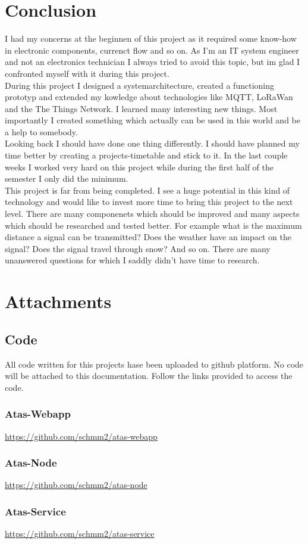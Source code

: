 \documentclass[a4paper,11pt, oneside]{report}
\theoremstyle{definition}
\begin{document}
\chapter{Conclusion}
I had my concerns at the beginnen of this project as it required some know-how in electronic components, currenct flow and so on. As I'm an IT system engineer and not an electronics technician I always tried to avoid this topic, but im glad I confronted myself with it during this project.\\[0.3cm]
During this project I designed a systemarchitecture, created a functioning prototyp and extended my kowledge about technologies like MQTT, LoRaWan and the The Things Network. I learned many interesting new things. Most importantly I created something which actually can be used in this world and be a help to somebody.\\[0.3cm]
Looking back I should have done one thing differently. I should have planned my time better by creating a projects-timetable and stick to it. In the last couple weeks I worked very hard on this project while during the first half of the semester I only did the minimum.\\[0.3cm]
This project is far from being completed. I see a huge potential in this kind of technology and would like to invest more time to bring this project to the next level. There are many componenets which should be improved and many aspects which should be researched and tested better. For example what is the maximum distance a signal can be transmitted? Does the weather have an impact on the signal? Does the signal travel through snow? And so on. There are many unanswered questions for which I saddly didn't have time to research.


\chapter{Attachments}
\section{Code}
All code written for this projects hase been uploaded to github platform. No code will be attached to this documentation. Follow the links provided to access the code.
\subsection{Atas-Webapp}
\url{https://github.com/schmm2/atas-webapp}
\subsection{Atas-Node}
\url{https://github.com/schmm2/atas-node}
\subsection{Atas-Service}
\url{https://github.com/schmm2/atas-service}


\printglossaries
\end{document}
